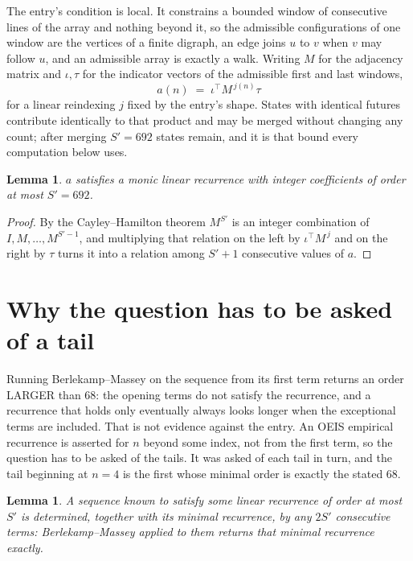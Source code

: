 \documentclass[11pt,a4paper]{article}
\theoremstyle{plain}
\newtheorem{lemma}[theorem]{Lemma}
\theoremstyle{definition}
\begin{document}
The entry's condition is local. It constrains a bounded window of consecutive lines of the
array and nothing beyond it, so the admissible configurations of one window are the vertices of
a finite digraph, an edge joins $u$ to $v$ when $v$ may follow $u$, and an admissible array is
exactly a walk. Writing $M$ for the adjacency matrix and $\iota,\tau$ for the indicator vectors
of the admissible first and last windows,
\[
a(n)\;=\;\iota^{\!\top}M^{\,j(n)}\tau
\]
for a linear reindexing $j$ fixed by the entry's shape. States with identical futures
contribute identically to that product and may be merged without changing any count; after
merging $S'=692$ states remain, and it is that bound every computation below uses.

\begin{lemma}\label{lem:cf}
$a$ satisfies a monic linear recurrence with integer coefficients of order at most $S'=692$.
\end{lemma}

\begin{proof}
By the Cayley--Hamilton theorem $M^{S'}$ is an integer combination of $I,M,\dots,M^{S'-1}$,
and multiplying that relation on the left by $\iota^{\!\top}M^{\,j}$ and on the right by
$\tau$ turns it into a relation among $S'+1$ consecutive values of $a$.
\end{proof}

\section{Why the question has to be asked of a tail}

Running Berlekamp--Massey on the sequence from its first term returns an order LARGER than $68$: the opening terms do not satisfy the recurrence, and a recurrence that holds only eventually always looks longer when the exceptional terms are included. That is not evidence against the entry. An OEIS empirical recurrence is asserted for $n$ beyond some index, not from the first term, so the question has to be asked of the tails. It was asked of each tail in turn, and the tail beginning at $n=4$ is the first whose minimal order is exactly the stated $68$.

\begin{lemma}\label{lem:bm}
A sequence known to satisfy some linear recurrence of order at most $S'$ is determined,
together with its minimal recurrence, by any $2S'$ consecutive terms: Berlekamp--Massey applied
to them returns that minimal recurrence exactly.
\end{lemma}
\end{document}
